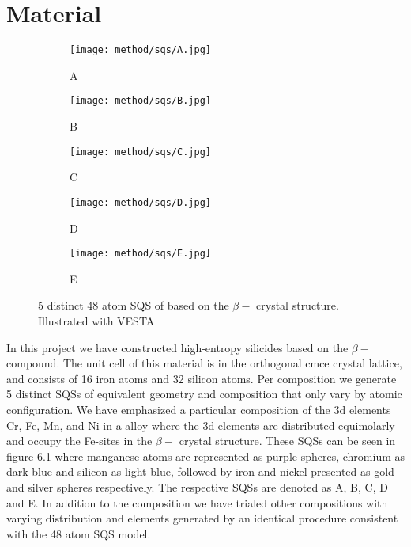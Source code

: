 \section{Material}

\begin{figure}[H]
\begin{subfigure}{0.5\textwidth}
\texttt{[image: method/sqs/A.jpg]}
\caption{A}
\end{subfigure}
\hfill
\begin{subfigure}{0.5\textwidth}
\texttt{[image: method/sqs/B.jpg]}
\caption{B}
\end{subfigure}
\begin{subfigure}{0.5\textwidth}
\texttt{[image: method/sqs/C.jpg]}
\caption{C}
\end{subfigure}
\hfill
\begin{subfigure}{0.5\textwidth}
\texttt{[image: method/sqs/D.jpg]}
\caption{D}
\end{subfigure}
\begin{subfigure}{0.5\textwidth}
\texttt{[image: method/sqs/E.jpg]}
\caption{E}
\end{subfigure}
\caption{5 distinct 48 atom SQS of  based on the $\beta-$  crystal structure. Illustrated with VESTA \cite{vesta}}
\label{sqs_FeSi2}
\end{figure}

In this project we have constructed high-entropy silicides based on the $\beta-$  compound. The unit cell of this material is in the orthogonal cmce crystal lattice, and consists of 16 iron atoms and 32 silicon atoms. Per composition we generate 5 distinct SQSs of equivalent geometry and composition that only vary by atomic configuration. We have emphasized a particular composition of the 3d elements Cr, Fe, Mn, and Ni in a  alloy where the 3d elements are distributed equimolarly and occupy the Fe-sites in the $\beta-$  crystal structure. These SQSs can be seen in figure 6.1 where manganese atoms are represented as purple spheres, chromium as dark blue and silicon as light blue, followed by iron and nickel presented as gold and silver spheres respectively. The respective SQSs are denoted as A, B, C, D and E. In addition to the  composition we have trialed other compositions with varying distribution and elements generated by an identical procedure consistent with the 48 atom SQS model.
